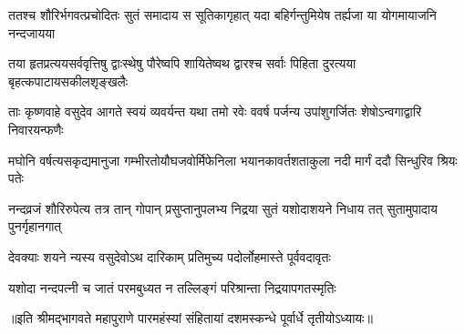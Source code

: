 \fourlineindentedshloka
{ततश्च शौरिर्भगवत्प्रचोदितः}
{सुतं समादाय स सूतिकागृहात्}
{यदा बहिर्गन्तुमियेष तर्ह्यजा}
{या योगमायाजनि नन्दजायया} %

\fourlineindentedshloka
{तया हृतप्रत्ययसर्ववृत्तिषु}
{द्वाःस्थेषु पौरेष्वपि शायितेष्वथ}
{द्वारश्च सर्वाः पिहिता दुरत्यया}
{बृहत्कपाटायसकीलशृङ्खलैः} %

\fourlineindentedshloka
{ताः कृष्णवाहे वसुदेव आगते}
{स्वयं व्यवर्यन्त यथा तमो रवेः}
{ववर्ष पर्जन्य उपांशुगर्जितः}
{शेषोऽन्वगाद्वारि निवारयन्फणैः} %

\fourlineindentedshloka
{मघोनि वर्षत्यसकृद्यमानुजा}
{गम्भीरतोयौघजवोर्मिफेनिला}
{भयानकावर्तशताकुला नदी}
{मार्गं ददौ सिन्धुरिव श्रियः पतेः} %

\fourlineindentedshloka
{नन्दव्रजं शौरिरुपेत्य तत्र तान्}
{गोपान् प्रसुप्तानुपलभ्य निद्रया}
{सुतं यशोदाशयने निधाय तत्}
{सुतामुपादाय पुनर्गृहानगात्} %

\twolineshloka
{देवक्याः शयने न्यस्य वसुदेवोऽथ दारिकाम्}
{प्रतिमुच्य पदोर्लोहमास्ते पूर्ववदावृतः} %

\twolineshloka
{यशोदा नन्दपत्नी च जातं परमबुध्यत}
{न तल्लिङ्गं परिश्रान्ता निद्रयापगतस्मृतिः}


॥इति श्रीमद्भागवते महापुराणे पारमहंस्यां संहितायां दशमस्कन्धे पूर्वार्धे तृतीयोऽध्यायः॥

